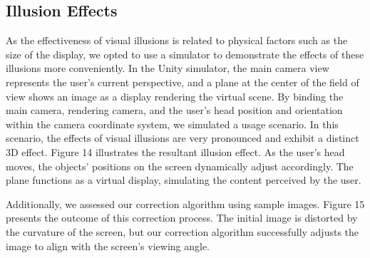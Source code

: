 \subsection{Illusion Effects}

As the effectiveness of visual illusions is related to physical factors such as the size of the display, we opted to use a simulator to demonstrate the effects of these illusions more conveniently. In the Unity simulator, the main camera view represents the user's current perspective, and a plane at the center of the field of view shows an image as a display rendering the virtual scene. By binding the main camera, rendering camera, and the user's head position and orientation within the camera coordinate system, we simulated a usage scenario. In this scenario, the effects of visual illusions are very pronounced and exhibit a distinct 3D effect. Figure 14 illustrates the resultant illusion effect. As the user’s head moves, the objects' positions on the screen dynamically adjust accordingly. The plane functions as a virtual display, simulating the content perceived by the user.

Additionally, we assessed our correction algorithm using sample images. Figure 15 presents the outcome of this correction process. The initial image is distorted by the curvature of the screen, but our correction algorithm successfully adjusts the image to align with the screen's viewing angle.

